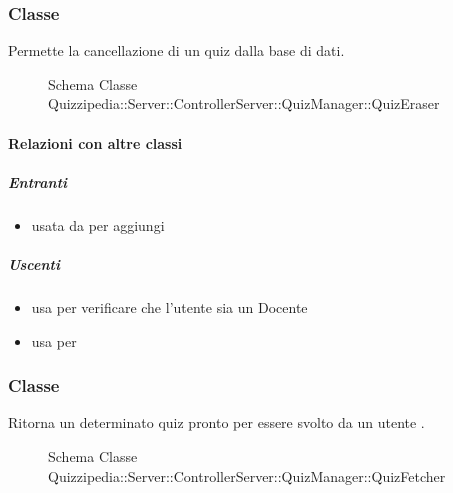 \subsubsection{Classe }
Permette la cancellazione di un quiz dalla base di dati.
\begin{figure}[H]
\centering
\noindent{}
\caption[Schema Classe QuizEraser]{Schema Classe Quizzipedia::Server::ControllerServer::QuizManager::QuizEraser}
\end{figure}
\paragraph{Relazioni con altre classi}
\subparagraph{Entranti}
\begin{itemize}
\item usata da  per aggiungi
\end{itemize}
\subparagraph{Uscenti}
\begin{itemize}
\item usa  per verificare che l'utente sia un Docente
\item usa  per 
\end{itemize}
\subsubsection{Classe }
Ritorna un determinato quiz pronto per essere svolto da un utente .
\begin{figure}[H]
\centering
\noindent{}
\caption[Schema Classe QuizFetcher]{Schema Classe Quizzipedia::Server::ControllerServer::QuizManager::QuizFetcher}
\end{figure}

